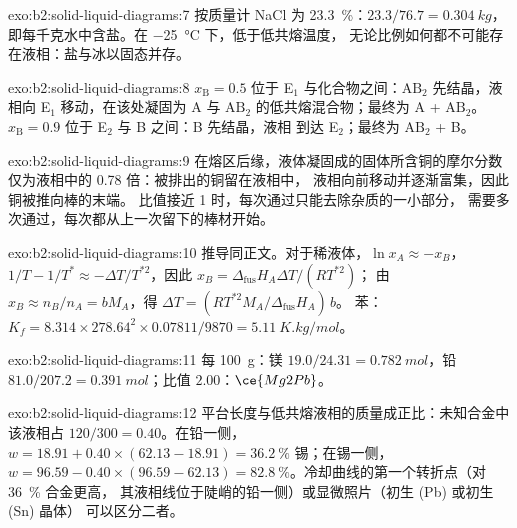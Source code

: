 \begin{solution}{exo:b2:solid-liquid-diagrams:7}
按质量计 NaCl 为 23.3~\%：$23.3/76.7 = \qty{0.304}{kg}$，
即每千克水中含盐。在 \qty{-25}{\degreeCelsius} 下，低于低共熔温度，
无论比例如何都不可能存在液相：盐与冰以固态并存。
\end{solution}

\begin{solution}{exo:b2:solid-liquid-diagrams:8}
$x_{\mathrm B} = 0.5$ 位于 E$_1$ 与化合物之间：$\mathrm{AB_2}$
先结晶，液相向 E$_1$ 移动，在该处凝固为
A 与 $\mathrm{AB_2}$ 的低共熔混合物；最终为 A + $\mathrm{AB_2}$。
$x_{\mathrm B} = 0.9$ 位于 E$_2$ 与 B 之间：B 先结晶，液相
到达 E$_2$；最终为 $\mathrm{AB_2}$ + B。
\end{solution}

\begin{solution}{exo:b2:solid-liquid-diagrams:9}
在熔区后缘，液体凝固成的固体所含铜的摩尔分数
仅为液相中的 0.78 倍：被排出的铜留在液相中，
液相向前移动并逐渐富集，因此铜被推向棒的末端。
比值接近 1 时，每次通过只能去除杂质的一小部分，
需要多次通过，每次都从上一次留下的棒材开始。
\end{solution}

\begin{solution}{exo:b2:solid-liquid-diagrams:10}
推导同正文。对于稀液体，$\ln x_A \approx -x_B$，$1/T -
1/T^* \approx -\Delta T/T^{*2}$，因此 $x_B = \Delta_{\text{fus}}H_A\Delta T/(RT^{*2})$；
由 $x_B \approx n_B/n_A = bM_A$，得 $\Delta T = (RT^{*2}M_A/\Delta_{\text{fus}}H_A)\,b$。
苯：$K_f = 8.314 \times 278.64^2 \times 0.07811/9870 = \qty{5.11}{K.kg/mol}$。
\end{solution}

\begin{solution}{exo:b2:solid-liquid-diagrams:11}
每 \qty{100}{g}：镁 $19.0/24.31 = \qty{0.782}{mol}$，铅 $81.0/207.2 =
\qty{0.391}{mol}$；比值 $2.00$：$\ce{Mg2Pb}$。
\end{solution}

\begin{solution}{exo:b2:solid-liquid-diagrams:12}
平台长度与低共熔液相的质量成正比：未知合金中该液相占
$120/300 = 0.40$。在铅一侧，$w = 18.91 + 0.40 \times (62.13 -
18.91) = 36.2~\%$ 锡；在锡一侧，$w = 96.59 - 0.40 \times (96.59 - 62.13) =
82.8~\%$。冷却曲线的第一个转折点（对 36~\% 合金更高，
其液相线位于陡峭的铅一侧）或显微照片（初生 (Pb) 或初生 (Sn) 晶体）
可以区分二者。
\end{solution}

